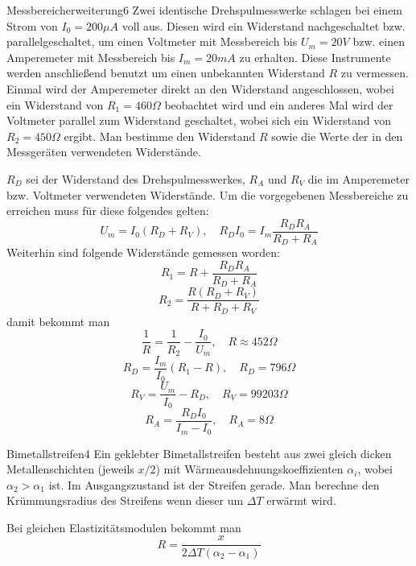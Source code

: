 \begin{problem}{Messbereicherweiterung}{6}
Zwei identische Drehspulmesswerke schlagen bei einem Strom von $I_0 = 200 \unit{\mu A}$ voll aus. Diesen wird ein Widerstand nachgeschaltet bzw. parallelgeschaltet, um einen Voltmeter mit Messbereich bis $U_m = 20 \unit{V}$ bzw. einen Amperemeter mit Messbereich bis $I_m = 20 \unit{mA}$ zu erhalten. Diese Instrumente werden anschließend benutzt um einen unbekannten Widerstand $R$ zu vermessen. Einmal wird der Amperemeter direkt an den Widerstand angeschlossen, wobei ein Widerstand von $R_1 = 460 \unit{\Omega}$ beobachtet wird und ein anderes Mal wird der Voltmeter parallel zum Widerstand geschaltet, wobei sich ein Widerstand von $R_2 = 450 \unit{\Omega}$ ergibt. Man bestimme den Widerstand $R$ sowie die Werte der in den Messgeräten verwendeten Widerstände.

\begin{solution}
$R_D$ sei der Widerstand des Drehspulmesswerkes, $R_A$ und $R_V$ die im Amperemeter bzw. Voltmeter verwendeten Widerstände. Um die vorgegebenen Messbereiche zu erreichen muss für diese folgendes gelten:
\[
U_m = I_0 (R_D + R_V), \quad R_D I_0 = I_m \frac{R_D R_A}{R_D+R_A}
\]
Weiterhin sind folgende Widerstände gemessen worden:
\[
R_1 = R + \frac{R_D R_A}{R_D+R_A}
\]
\[
R_2 = \frac{R (R_D+R_V)}{R+R_D+R_V}
\]
damit bekommt man
\[
\frac1R = \frac1{R_2} - \frac{I_0}{U_m}, \quad R \approx 452 \unit{\Omega}
\]
\[
R_D = \frac{I_m}{I_0} (R_1 - R), \quad R_D = 796 \unit{\Omega}
\]
\[
R_V = \frac{U_m}{I_0} - R_D, \quad R_V = 99203 \unit{\Omega}
\]
\[
R_A = \frac{R_D I_0}{I_m - I_0}, \quad R_A = 8 \unit{\Omega}
\]

\end{solution}

\end{problem}

\begin{problem}{Bimetallstreifen}{4}
Ein geklebter Bimetallstreifen besteht aus zwei gleich dicken Metallenschichten (jeweils $x/2$) mit Wärmeausdehnungskoeffizienten $\alpha_i$, wobei $\alpha_2 > \alpha_1$ ist. Im Ausgangszustand ist der Streifen gerade. Man berechne den Krümmungsradius des Streifens wenn dieser um $\Delta T$ erwärmt wird.

\begin{solution}
Bei gleichen Elastizitätsmodulen bekommt man
\[
R = \frac{x}{2 \Delta T (\alpha_2-\alpha_1)}
\]
\end{solution}

\end{problem}

